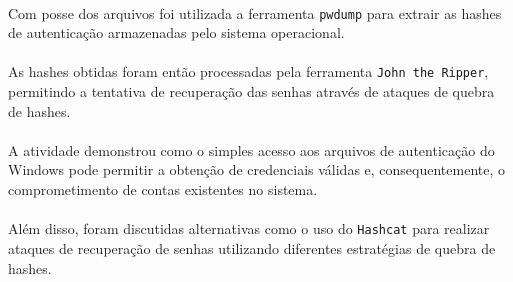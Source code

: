 \paragraph{}
Com posse dos arquivos foi utilizada a ferramenta \texttt{pwdump} para extrair
as hashes de autenticação armazenadas pelo sistema operacional.

\paragraph{}
As hashes obtidas foram então processadas pela ferramenta \texttt{John the
Ripper}, permitindo a tentativa de recuperação das senhas através de ataques de
quebra de hashes.

\paragraph{}
A atividade demonstrou como o simples acesso aos arquivos de autenticação do
Windows pode permitir a obtenção de credenciais válidas e, consequentemente, o
comprometimento de contas existentes no sistema.

\paragraph{}
Além disso, foram discutidas alternativas como o uso do \texttt{Hashcat} para
realizar ataques de recuperação de senhas utilizando diferentes estratégias de
quebra de hashes.
